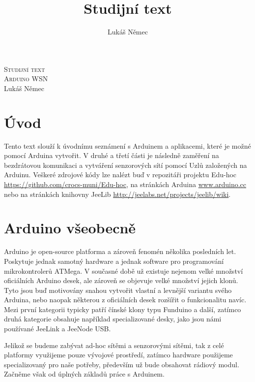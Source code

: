 \documentclass[12pt,titlepage]{article}
\title{Studijní text}
\author{Lukáš Němec}
\begin{document}
\begin{titlepage}
\begin{center}
\textsc{\LARGE Studijní text}\\[1cm]
\textsc{\Large Arduino WSN}\\[0.6cm]


\Large{Lukáš Němec}\\[1cm]

\bigskip
\bigskip

\end{center}
\end{titlepage}



\tableofcontents
\newpage
\section{Úvod}

Tento text slouží k úvodnímu seznámení s Arduinem a aplikacemi, které je možné pomocí Arduina vytvořit. V druhé a třetí části je následně zaměření na bezdrátovou komunikaci a vytváření senzorových sítí pomocí Uzlů založených na Arduinu. Veškeré zdrojové kódy lze nalézt buď v repozitáři projektu Edu-hoc \url{https://github.com/crocs-muni/Edu-hoc}, na stránkách Arduina \url{www.arduino.cc} nebo na stránkách knihovny JeeLib \url{http://jeelabs.net/projects/jeelib/wiki}.

\section{Arduino všeobecně}
Arduino je open-source platforma a zároveň fenomén několika posledních let. Poskytuje jednak samotný hardware a jednak software pro programování mikrokontrolerů ATMega. V současné době už existuje nejenom velké množství oficiálních Arduino desek, ale zároveň se objevuje velké množství jejich klonů. Tyto jsou buď motivovány snahou vytvořit vlastní a levnější variantu svého Arduina, nebo naopak některou z oficiálních desek rozšířit o funkcionalitu navíc. Mezi první kategorii typicky patří čínské klony typu Funduino a další, zatímco druhá kategorie obsahuje například specializované desky, jako jsou námi používané JeeLink a JeeNode USB.

Jelikož se budeme zabývat ad-hoc sítěmi a senzorovými sítěmi, tak z celé platformy využijeme pouze vývojové prostředí, zatímco hardware použijeme specializovaný pro naše potřeby, především už bude obsahovat rádiový modul. Začněme však od úplných základů práce s Arduinem.
\end{document}
